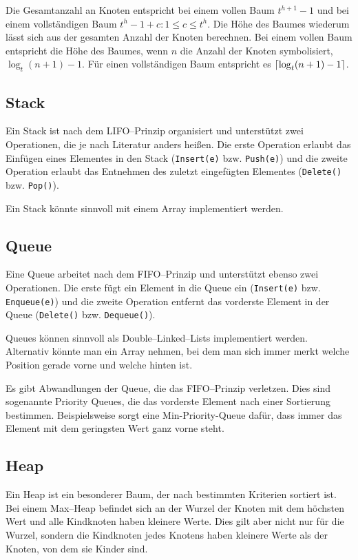 \documentclass[10pt,a4paper,oneside,ngerman,numbers=noenddot]{scrartcl}
\DeclarePairedDelimiter{\ceil}{\lceil}{\rceil}
\begin{document}
		Die Gesamtanzahl an Knoten entspricht bei einem vollen Baum $t^{h+1}-1$ und bei einem vollständigen Baum $t^{h} - 1 + c : 1 \leq c \leq t^{h}$. Die Höhe des Baumes wiederum lässt sich aus der gesamten Anzahl der Knoten berechnen. Bei einem vollen Baum entspricht die Höhe des Baumes, wenn $n$ die Anzahl der Knoten symbolisiert, $\log_{t}(n+1) - 1$. Für einen vollständigen Baum entspricht es $\ceil*{\log_{t}(n+1)-1}$.
		
	\subsection{Stack}
	
		Ein Stack ist nach dem LIFO--Prinzip organisiert und unterstützt zwei Operationen, die je nach Literatur anders heißen. Die erste Operation erlaubt das Einfügen eines Elementes in den Stack (\texttt{Insert(e)} bzw. \texttt{Push(e)}) und die zweite Operation erlaubt das Entnehmen des zuletzt eingefügten Elementes (\texttt{Delete()} bzw. \texttt{Pop()}).
		
		Ein Stack könnte sinnvoll mit einem Array implementiert werden.
		
	\subsection{Queue}
	
		Eine Queue arbeitet nach dem FIFO--Prinzip und unterstützt ebenso zwei Operationen. Die erste fügt ein Element in die Queue ein (\texttt{Insert(e)} bzw. \texttt{Enqueue(e)}) und die zweite Operation entfernt das vorderste Element in der Queue (\texttt{Delete()} bzw. \texttt{Dequeue()}).
		
		Queues können sinnvoll als Double--Linked--Lists implementiert werden. Alternativ könnte man ein Array nehmen, bei dem man sich immer merkt welche Position gerade vorne und welche hinten ist.
		
		Es gibt Abwandlungen der Queue, die das FIFO--Prinzip verletzen. Dies sind sogenannte Priority Queues, die das vorderste Element nach einer Sortierung bestimmen. Beispielsweise sorgt eine Min-Priority-Queue dafür, dass immer das Element mit dem geringsten Wert ganz vorne steht.
		
	\subsection{Heap}
	
		Ein Heap ist ein besonderer Baum, der nach bestimmten Kriterien sortiert ist. Bei einem Max--Heap befindet sich an der Wurzel der Knoten mit dem höchsten Wert und alle Kindknoten haben kleinere Werte. Dies gilt aber nicht nur für die Wurzel, sondern die Kindknoten jedes Knotens haben kleinere Werte als der Knoten, von dem sie Kinder sind.
		
\end{document}
